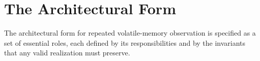 %
%
%
%
%
%
%



\section{The Architectural Form}\label{sec:form}

The architectural form for repeated volatile-memory observation is specified as a set of essential roles, each defined by its responsibilities and by the invariants that any valid realization must preserve.

